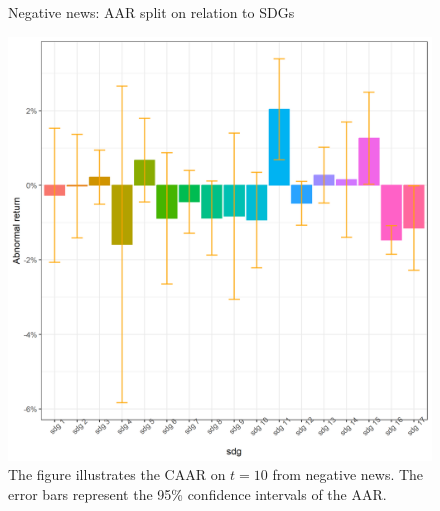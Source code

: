 \begin{figure} [H]
    \centering
    \caption{Negative news: AAR split on relation to SDGs}
    \includegraphics[scale=0.6]{Projekt/1.Figures analysis/ST_negative_sdg_bar.png}
    \caption*{\footnotesize The figure illustrates the CAAR on $t = 10$ from negative news. The error bars represent the 95\% confidence intervals of the AAR.}
    \label{fig:ST_neg_bar_all}
\end{figure}

